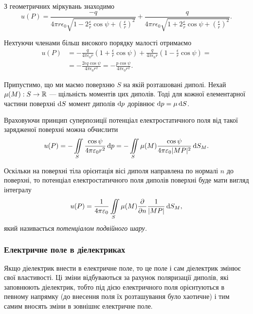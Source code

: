 З геометричних міркувань знаходимо
\begin{equation}
	u(P) = \frac{-q}{4\pi r\epsilon_0 \sqrt{1-2\frac{\epsilon}{r}\cos\psi+\left(\frac{\epsilon}{r}\right)^2}} + \frac{q}{4\pi r\epsilon_0 \sqrt{1+2\frac{\epsilon}{r}\cos\psi+\left(\frac{\epsilon}{r}\right)^2}}.
\end{equation}

Нехтуючи членами більш високого порядку малості отримаємо
\begin{equation}
	\begin{aligned}
		u(P) &= -\frac{q}{4\pi\epsilon_0 r} \left( 1 + \frac{\epsilon}{r}\cos\psi\right) + \frac{q}{4\pi\epsilon_0 r} \left( 1 - \frac{\epsilon}{r}\cos\psi\right) = \\
		&= -\frac{2\epsilon q\cos \psi}{4\pi\epsilon_0 r^2} = - \frac{p\cos\psi}{4\pi\epsilon_0 r^2}.
	\end{aligned}
\end{equation}

Припустимо, що ми маємо поверхню $S$ на якій розташовані диполі. Нехай $\mu(M): S \to \mathbb{R}$ --- щільність моментів цих диполів. Тоді для кожної елементарної частини поверхні $\mathop{}\!\mathrm{d} S$ момент диполів $\mathop{}\!\mathrm{d} p$ дорівнює $\mathop{}\!\mathrm{d} p = \mu \mathop{}\!\mathrm{d} S$. \medskip

Враховуючи принцип суперпозиції потенціал електростатичного поля від такої зарядженої поверхні можна обчислити
\begin{equation}
	u(P) = -\displaystyle\iint\limits_S \frac{\cos\psi}{4\pi\varepsilon_0 r^2} \mathop{}\!\mathrm{d} p = - \displaystyle\iint\limits_S \mu(M) \frac{\cos\psi}{4\pi\varepsilon_0 |MP|^2} \mathop{}\!\mathrm{d} S_M.
\end{equation}

\begin{definition}
	Оскільки на поверхні тіла орієнтація вісі диполя направлена по нормалі $n$ до поверхні, то потенціал електростатичного поля диполів поверхні буде мати вигляд інтегралу
	\begin{equation}
		u(P) = \frac{1}{4 \pi \varepsilon_0} \displaystyle\iint\limits_S \mu(M) \frac{\partial}{\partial n} \frac{1}{|MP|} \mathop{}\!\mathrm{d} S_M,
	\end{equation}
	який називається \it{потенціалом подвійного шару}.
\end{definition}

\subsubsection{Електричне поле в діелектриках}

Якщо діелектрик внести в електричне поле, то це поле і сам діелектрик змінює свої властивості. Ці зміни відбуваються за рахунок поляризації диполів, які заповнюють діелектрик, тобто під дією електричного поля орієнтуються в певному напрямку (до внесення поля їх розташування було хаотичне) і тим самим вносять зміни в зовнішнє електричне поле. 

